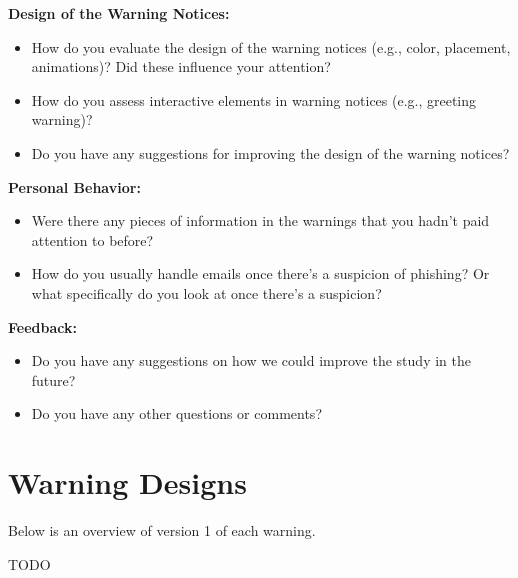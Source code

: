 \documentclass[
  a4paper,  %
  twoside,  %
  bibliography=totoc,
  headsepline,
  cleardoublepage=empty,
  parskip=half,
  draft=false
]{scrbook}
\begin{document}
\textbf{Design of the Warning Notices:}

    \begin{itemize}
        \item How do you evaluate the design of the warning notices (e.g., color, placement, animations)? Did these influence your attention?
        \item How do you assess interactive elements in warning notices (e.g., greeting warning)?
        \item Do you have any suggestions for improving the design of the warning notices?
    \end{itemize}

\textbf{Personal Behavior:
}
    \begin{itemize}
        \item Were there any pieces of information in the warnings that you hadn't paid attention to before?
        \item How do you usually handle emails once there's a suspicion of phishing? Or what specifically do you look at once there's a suspicion?
    \end{itemize}

\textbf{Feedback:
}
    \begin{itemize}
        \item Do you have any suggestions on how we could improve the study in the future?
        \item Do you have any other questions or comments?
    \end{itemize}
    
\section{Warning Designs}
\label{sec:warnings}
Below is an overview of version 1 of each warning.

TODO
\end{document}
